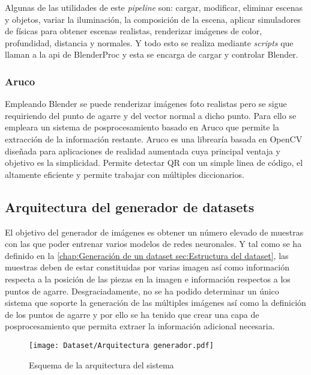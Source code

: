 Algunas de las utilidades de este \textit{pipeline} son: cargar, modificar, eliminar escenas y objetos, variar la iluminación, la composición de la escena, aplicar simuladores de físicas para obtener escenas realistas, renderizar imágenes de color, profundidad, distancia y normales. Y todo esto se realiza mediante \textit{scripts} que llaman a la \acs{api} de BlenderProc y esta se encarga de cargar y controlar Blender.

\subsubsection*{Aruco}
\label{chap:Generación de un dataset subsec:Aruco}
Empleando Blender se puede renderizar imágenes foto realistas pero se sigue requiriendo del punto de agarre y del vector normal a dicho punto. Para ello se empleara un sistema de posprocesamiento basado en Aruco \citep{ArUco} que permite la extracción de la información restante. Aruco es una librearía basada en OpenCV diseñada para aplicaciones de realidad aumentada cuya principal ventaja y objetivo es la simplicidad. Permite detectar QR con un simple linea de código, el altamente eficiente y permite trabajar con múltiples diccionarios.

\subsection{Arquitectura del generador de datasets}	
\label{chap:Generación de un dataset sec:Arquitectura del generador de imágenes}
El objetivo del generador de imágenes es obtener un número elevado de muestras con las que poder entrenar varios modelos de redes neuronales. Y tal como se ha definido en la \autoref{chap:Generación de un dataset sec:Estructura del dataset}, las muestras deben de estar constituidas por varias imagen así como información respecta a la posición de las piezas en la imagen e información respectos a los puntos de agarre. Desgraciadamente, no se ha podido determinar un único sistema que soporte la generación de las múltiples imágenes así como la definición de los puntos de agarre y por ello se ha tenido que crear una capa de posprocesamiento que permita extraer la información adicional necesaria.

\begin{figure}[ht]
	\centering
	\texttt{[image: Dataset/Arquitectura generador.pdf]}
	\caption{Esquema de la arquitectura del sistema}
	\label{chap:Generación de un dataset fig:Arquitectura generador}
	\vspace{-5pt}
\end{figure}

